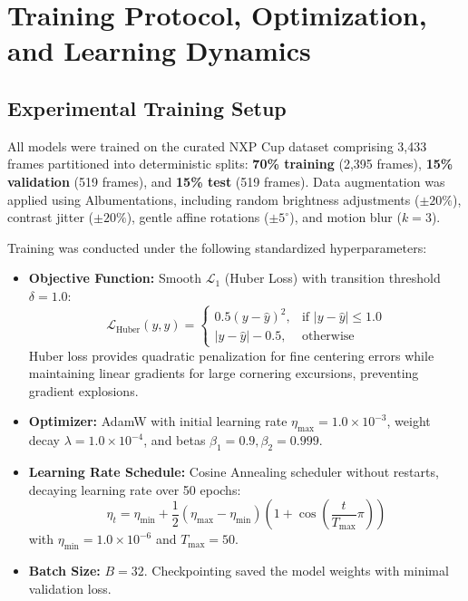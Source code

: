 \documentclass[10pt,journal,compsoc]{IEEEtran}
\begin{document}
\section{Training Protocol, Optimization, and Learning Dynamics}
\label{sec:training}

\subsection{Experimental Training Setup}
All models were trained on the curated NXP Cup dataset comprising 3,433 frames partitioned into deterministic splits: \textbf{70\% training} (2,395 frames), \textbf{15\% validation} (519 frames), and \textbf{15\% test} (519 frames). Data augmentation was applied using Albumentations, including random brightness adjustments ($\pm 20\%$), contrast jitter ($\pm 20\%$), gentle affine rotations ($\pm 5^\circ$), and motion blur ($k=3$).

Training was conducted under the following standardized hyperparameters:
\begin{itemize}
    \item \textbf{Objective Function:} Smooth $\mathcal{L}_1$ (Huber Loss) with transition threshold $\delta = 1.0$:
    \begin{equation}
    \mathcal{L}_{\text{Huber}}(y, \hat{y}) = \begin{cases} 0.5 (y - \hat{y})^2, & \text{if } |y - \hat{y}| \le 1.0 \\ |y - \hat{y}| - 0.5, & \text{otherwise} \end{cases}
    \end{equation}
    Huber loss provides quadratic penalization for fine centering errors while maintaining linear gradients for large cornering excursions, preventing gradient explosions.
    \item \textbf{Optimizer:} AdamW with initial learning rate $\eta_{\max} = 1.0 \times 10^{-3}$, weight decay $\lambda = 1.0 \times 10^{-4}$, and betas $\beta_1 = 0.9, \beta_2 = 0.999$.
    \item \textbf{Learning Rate Schedule:} Cosine Annealing scheduler without restarts, decaying learning rate over 50 epochs:
    \begin{equation}
    \eta_t = \eta_{\min} + \frac{1}{2}(\eta_{\max} - \eta_{\min})\left(1 + \cos\left(\frac{t}{T_{\max}}\pi\right)\right)
    \end{equation}
    with $\eta_{\min} = 1.0 \times 10^{-6}$ and $T_{\max} = 50$.
    \item \textbf{Batch Size:} $B = 32$. Checkpointing saved the model weights with minimal validation loss.
\end{itemize}
\end{document}
